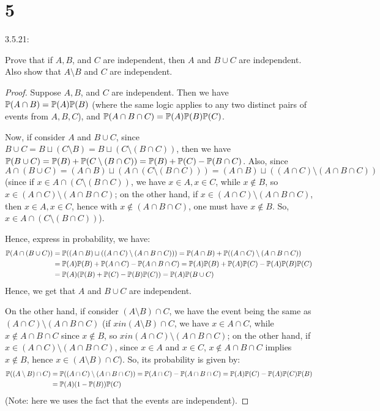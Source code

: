 \documentclass{article}
\begin{document}
\newpage

\section*{5}
\begin{ques}\label{q5}
    3.5.21:

    Prove that if $A,B$, and $C$ are independent, then $A$ and $B \cup C$ are independent. Also show that $A\setminus B$ and $C$ are independent.
\end{ques}

\begin{proof}
    Suppose $A,B$, and $C$ are independent. Then we have $\mathbb{P}(A\cap B)=\mathbb{P}(A)\mathbb{P}(B)$ (where the same logic applies to any two distinct pairs of events from $A,B,C$), and $\mathbb{P}(A\cap B\cap C)=\mathbb{P}(A)\mathbb{P}(B)\mathbb{P}(C)$.

    \hfil

    Now, if consider $A$ and $B\cup C$, since $B \cup C=B \sqcup (C\setminus B) = B\sqcup (C\setminus (B\cap C))$, then we have $\mathbb{P}(B\cup C)=\mathbb{P}(B)+\mathbb{P}(C\setminus (B\cap C))=\mathbb{P}(B)+\mathbb{P}(C)-\mathbb{P}(B\cap C)$. Also, since $A\cap (B\cup C) = (A\cap B)\sqcup (A\cap (C\setminus (B\cap C))) = (A\cap B)\sqcup ((A\cap C)\setminus (A\cap B\cap C))$ (since if $x \in A\cap (C\setminus(B\cap C))$, we have $x\in A,x\in C$, while $x\notin B$, so $x\in (A\cap C)\setminus(A\cap B\cap C)$; on the other hand, if $x\in (A\cap C)\setminus(A\cap B\cap C)$, then $x\in A,x\in C$, hence with $x\notin (A\cap B\cap C)$, one must have $x\notin B$. So, $x\in A\cap (C\setminus(B\cap C))$).

    Hence, express in probability, we have:
    \begin{align}
        \mathbb{P}(A\cap (B\cup C))&=\mathbb{P}((A\cap B)\sqcup ((A\cap C)\setminus(A\cap B\cap C))) = \mathbb{P}(A\cap B)+\mathbb{P}((A\cap C)\setminus(A\cap B\cap C))\\
        &=\mathbb{P}(A)\mathbb{P}(B)+\mathbb{P}(A\cap C)-\mathbb{P}(A\cap B\cap C) = \mathbb{P}(A)\mathbb{P}(B)+\mathbb{P}(A)\mathbb{P}(C)-\mathbb{P}(A)\mathbb{P}(B)\mathbb{P}(C)\\
        &= \mathbb{P}(A)(\mathbb{P}(B)+\mathbb{P}(C)-\mathbb{P}(B)\mathbb{P}(C)) = \mathbb{P}(A)\mathbb{P}(B\cup C)
    \end{align}
    Hence, we get that $A$ and $B\cup C$ are independent.

    \hfil

    On the other hand, if consider $(A\setminus B)\cap C$, we have the event being the same as $(A\cap C)\setminus(A\cap B\cap C)$ (if $x in (A\setminus B)\cap C$, we have $x \in A\cap C$, while $x \notin A\cap B\cap C$ since $x \notin B$, so $x in (A\cap C)\setminus (A\cap B\cap C)$; on the other hand, if $x\in (A\cap C)\setminus(A\cap B\cap C)$, since $x\in A$ and $x\in C$, $x\notin A\cap B\cap C$ implies $x\notin B$, hence $x \in (A\setminus B)\cap C$). So, its probability is given by:
    \begin{align}
        \mathbb{P}((A\setminus B)\cap C)&=\mathbb{P}((A\cap C)\setminus (A\cap B\cap C)) = \mathbb{P}(A\cap C)-\mathbb{P}(A\cap B\cap C)=\mathbb{P}(A)\mathbb{P}(C)-\mathbb{P}(A)\mathbb{P}(C)\mathbb{P}(B)\\
        &= \mathbb{P}(A)(1-\mathbb{P}(B))\mathbb{P}(C)
    \end{align}
    (Note: here we uses the fact that the events are independent).


\end{proof}
\end{document}

